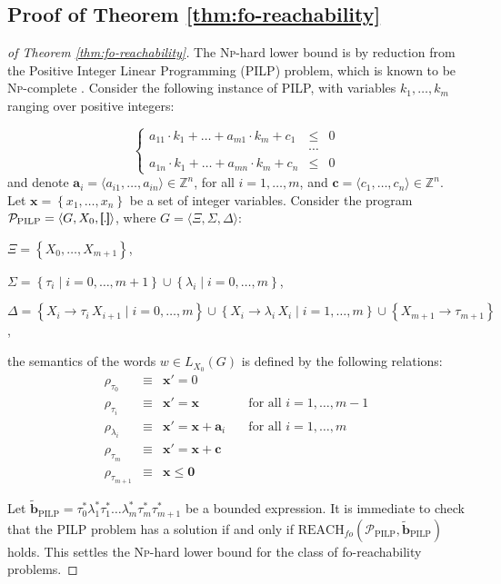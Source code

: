 \documentclass[final]{llncs}
\newcommand{\rbr}{{\bf ]\!\!]}}
\newcommand{\lbr}{{\bf [\!\![}}
\newcommand{\sem}[1]{\lbr #1 \rbr}
\renewcommand{\vec}[1]{{\bf {#1}}}
\def\set#1{{\left\{ #1 \right\}}}
\def\tuple#1{{\langle #1 \rangle}}
\def\zed{\mathbb{Z}}
\def\prod{\Delta}
\def\patt{{\widetilde{\mathbf{b}}}}
\def\Vars{\ensuremath{\Xi}}
\renewcommand{\vec}[1]{{\mathbf {#1}}}
\def\foreach{\mathrm{REACH}_{\mathit{fo}}}
\begin{document}
\subsection{Proof of Theorem \ref{thm:fo-reachability}}\label{app:fo-reachability}

\begin{proof}[of Theorem \ref{thm:fo-reachability}]
The \textsc{Np}-hard lower bound is by reduction from the Positive
Integer Linear Programming (PILP) problem, which is known to
be \textsc{Np}-complete \cite[Corollary 18.1a]{schrijver}.  Consider
the following instance of PILP, with variables $k_1, \ldots, k_m$
ranging over positive integers:

  \[\left\{\begin{array}{lcl}
  a_{11} \cdot k_1 + \ldots + a_{m1} \cdot k_m + c_1 & \leq & 0 \\
  & \cdots & \\
  a_{1n} \cdot k_1 + \ldots + a_{mn} \cdot k_m + c_n & \leq & 0 
  \end{array}\right.\]
  and denote $\vec{a}_i = \langle a_{i1}, \ldots, a_{in} \rangle \in \zed^n$,
  for all $i = 1, \ldots, m$, and $\vec{c} = \langle c_1, \ldots,
  c_n \rangle \in \zed^n$. Let $\vec{x}=\set{x_1,\ldots,x_n}$ be a set of integer variables.
  Consider the program $\mathcal{P}_{\mathrm{PILP}}=\tuple{G,X_0,\sem{.}}$, where
  $G = \tuple{\Vars,\Sigma,\prod}$:
  \begin{compactitem}
  \item $\Vars=\set{X_0,\ldots,X_{m+1}}$,
  \item $\Sigma=\set{\tau_i \mid i=0,\ldots,m+1} \cup \set{\lambda_i \mid i=0,\ldots,m}$,
  \item $\prod = \set{X_i \rightarrow \tau_i\, X_{i+1} \mid i=0,\ldots,m} \cup 
  \set{X_i \rightarrow \lambda_i\, X_i \mid i=1,\ldots,m} \cup 
  \set{X_{m+1} \rightarrow \tau_{m+1}}$, 
  \item the semantics of the words \(w\in L_{X_0}(G)\) is defined by the following relations:
  \[\begin{array}{lcll}
  \rho_{\tau_0} & \equiv & \vec{x}'=0 \\
  \rho_{\tau_i} & \equiv & \vec{x}'=\vec{x} & \quad \mbox{for all $i=1,\ldots,m-1$} \\
  \rho_{\lambda_i} & \equiv & \vec{x}'=\vec{x}+\vec{a}_i &\quad \mbox{for all $i=1,\ldots,m$} \\ 
  \rho_{\tau_m} & \equiv & \vec{x}'=\vec{x}+\vec{c} \\ 
  \rho_{\tau_{m+1}} & \equiv & \vec{x} \leq \vec{0} 
  \end{array}\]
  \end{compactitem}
  Let
  $\patt_{\mathrm{PILP}}=\tau_0^* \lambda_1^* \tau_1^* \ldots \lambda_m^* \tau_m^* \tau_{m+1}^*$
  be a bounded expression. It is immediate to check that the PILP
  problem has a solution if and only
  if \(\foreach(\mathcal{P}_{\mathrm{PILP}}, \patt_{\mathrm{PILP}})\)
  holds.  This settles the \textsc{Np}-hard lower bound for the class
  of fo-reachability problems.


\end{proof}
\end{document}
